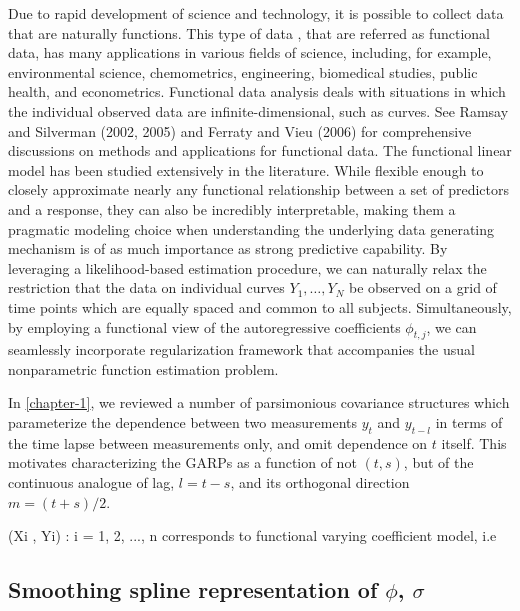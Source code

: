 \documentclass[12pt]{article}
\theoremstyle{definition}
\begin{document}

Due to rapid development of science and technology, it is possible to collect data that are naturally functions. This type of data , that are referred as functional data, has many applications in various fields of science, including, for example, environmental science, chemometrics, engineering, biomedical studies, public health, and econometrics. Functional data analysis deals with situations in which the individual observed data are infinite-dimensional, such as curves. See Ramsay and Silverman (2002, 2005) and Ferraty and Vieu (2006) for comprehensive discussions on methods and applications for functional data.  The functional linear model has been studied extensively in the literature. While flexible enough to closely approximate nearly any functional relationship between a set of predictors and a response, they can also be incredibly interpretable, making them a pragmatic modeling choice when understanding the underlying data generating mechanism is of as much importance as strong predictive capability. By leveraging a likelihood-based estimation procedure, we can naturally relax the restriction that the data on individual curves $Y_1,\dots, Y_N$ be observed on a grid of time points which are equally spaced and common to all subjects. Simultaneously, by employing a functional view of the autoregressive coefficients $\phi_{t,j}$, we can seamlessly incorporate regularization framework that accompanies the usual nonparametric function estimation problem.

\bigskip

In \ref{chapter-1}, we reviewed a number of parsimonious covariance structures which parameterize the dependence between two measurements $y_t$ and $y_{t-l}$ in terms of the time lapse between measurements only, and omit dependence on $t$ itself. This motivates characterizing the GARPs as a function of not $\left(t,s\right)$, but of the continuous analogue of lag, $l = t - s$, and its orthogonal direction $m = \left(t + s\right)/2$.

{(Xi
, Yi) : i = 1, 2, ..., n} corresponds to functional varying coefficient model, i.e

\subsection{Smoothing spline representation of $\phi$, $\sigma$}
\end{document}
